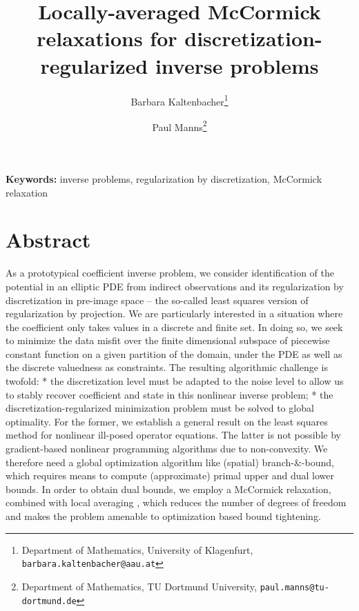 \documentclass[11pt]{article}
\title{\bfseries Locally-averaged McCormick relaxations for discretization-regularized inverse problems
}
\author{
Barbara Kaltenbacher\thanks{Department of Mathematics, University of Klagenfurt,
\texttt{barbara.kaltenbacher@aau.at}}
\and
Paul Manns\thanks{
Department of Mathematics, TU Dortmund University, 
\texttt{paul.manns@tu-dortmund.de}}
}
\date{}
\begin{document}
\maketitle

\vspace{-1em}

\noindent
\textbf{Keywords:}
inverse problems, regularization by discretization, McCormick relaxation

\vspace{0.5em}


\vspace{1em}

\section*{Abstract}

As a prototypical coefficient inverse problem, we consider identification of the potential in an elliptic PDE from indirect observations and its regularization by discretization in pre-image space -- the so-called least squares version of regularization by projection. We are particularly interested in a situation where the coefficient only takes values in a discrete and finite set. In doing so, we seek to minimize the data misfit over the finite dimensional subspace of piecewise constant function on a given partition of the domain, under the PDE as well as the discrete valuedness as constraints.
The resulting algorithmic challenge is twofold:
* the discretization level must be adapted to the noise level to allow us to stably recover coefficient and state in this nonlinear inverse problem;
* the discretization-regularized minimization problem must be solved to global optimality.
For the former, we establish a general result on the least squares method for nonlinear ill-posed operator equations.
The latter is not possible by gradient-based nonlinear programming algorithms due to non-convexity.
We therefore need a global optimization algorithm like (spatial) branch-\&-bound, which requires means to compute (approximate) primal upper and dual lower bounds. 
In order to obtain dual bounds, we employ a McCormick relaxation, combined with local averaging \cite{LeyfferManns2025mccormick}, which reduces the number of degrees of freedom and makes the problem amenable to optimization based bound tightening.


\vspace{1em}
\end{document}
